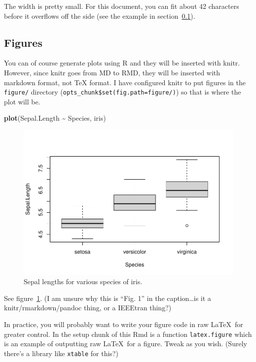 \documentclass[a4paper,conference]{IEEEtran}
\newenvironment{Shaded}{\begin{snugshade}}{\end{snugshade}}
\newcommand{\FunctionTok}[1]{\textcolor[rgb]{0.13,0.29,0.53}{\textbf{#1}}}
\newcommand{\NormalTok}[1]{#1}
\newcommand{\SpecialCharTok}[1]{\textcolor[rgb]{0.81,0.36,0.00}{\textbf{#1}}}
\begin{document}
The width is pretty small. For this document, you can fit about 42
characters before it overflows off the side (see the example in
section~\ref{sec:figures}).

\hypertarget{sec:figures}{%
\subsection{Figures}\label{sec:figures}}

You can of course generate plots using R and they will be inserted with
knitr. However, since knitr goes from MD to RMD, they will be inserted
with markdown format, not TeX format. I have configured knitr to put
figures in the \texttt{figure/} directory
(\texttt{opts\_chunk\$set(fig.path=\textquotesingle{}figure/\textquotesingle{})})
so that is where the plot will be.

\begin{Shaded}
\begin{Highlighting}[]
\FunctionTok{plot}\NormalTok{(Sepal.Length }\SpecialCharTok{\textasciitilde{}}\NormalTok{ Species, iris)}
\end{Highlighting}
\end{Shaded}

\begin{figure}
\centering
\includegraphics{figure/iris.plot-1.pdf}
\caption{Sepal lengths for various species of iris.\label{fig:iris}}
\end{figure}

See figure~\ref{fig:iris}. (I am unsure why this is ``Fig. 1'' in the
caption\ldots is it a knitr/rmarkdown/pandoc thing, or a IEEEtran
thing?)

In practice, you will probably want to write your figure code in raw
\LaTeX~for greater control. In the setup chunk of this Rmd is a function
\texttt{latex.figure} which is an example of outputting raw \LaTeX~for a
figure. Tweak as you wish. (Surely there's a library like
\texttt{xtable} for this?)
\end{document}
